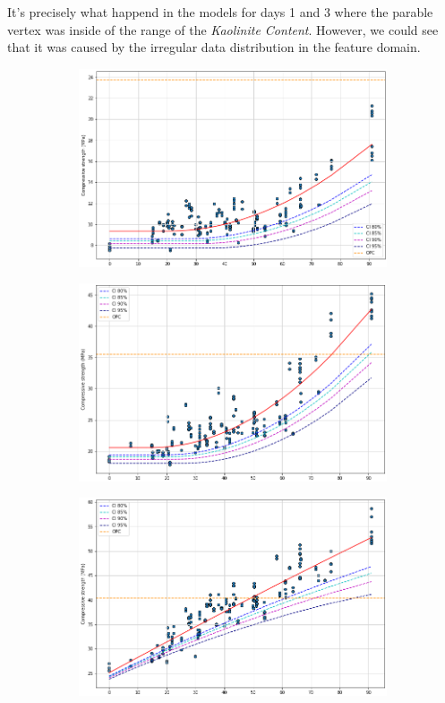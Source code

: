 \documentclass[10pt,conference,compsocconf]{IEEEtran}
\begin{document}
It's precisely what happend in the models for days 1 and 3 where the parable vertex was inside of the range of the \textit{Kaolinite Content}. However, we could see that it was caused by the irregular data distribution in the feature domain.


\newpage
\begin{figure}
\begin{subfigure}{.5\textwidth}
  \centering
  \includegraphics[width=0.84\columnwidth]{figures/day1_CI.png}
  \label{fig:sub-first}
\end{subfigure}
\newline
\begin{subfigure}{.5\textwidth}
  \centering
  \includegraphics[width=0.84\columnwidth]{figures/day3_CI.png}
  \label{fig:sub-second}
\end{subfigure}
\newline
\begin{subfigure}{.5\textwidth}
  \centering
  \includegraphics[width=0.84\columnwidth]{figures/day7_CI.png} 

\end{subfigure}
\end{figure}
\end{document}
